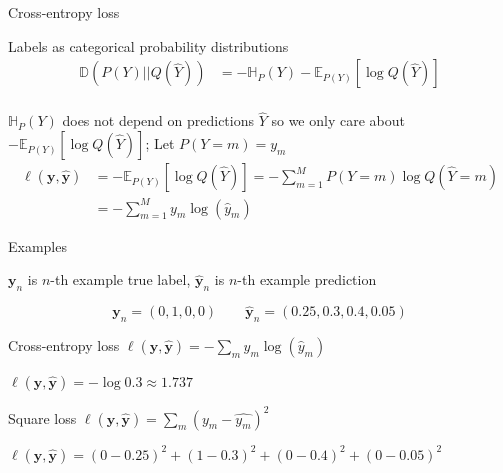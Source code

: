 \documentclass[12pt]{beamer}
\begin{document}
\begin{frame}{Cross-entropy loss}

Labels as categorical probability distributions
\begin{align*}
\mathbb{D}(P(Y) || Q(\hat{Y})) &= - \mathbb{H}_{P} (Y)  - \mathbb{E}_{P(Y)} \left[ \log Q(\hat{Y}) \right] \\
\end{align*}

$\mathbb{H}_{P} (Y)$ does not depend on predictions $\hat{Y}$ so we only care about $- \mathbb{E}_{P(Y)} \left[ \log Q(\hat{Y}) \right]$; Let $P(Y = m) = y_m$
\begin{align*}
\ell(\mathbf{y}, \hat{\mathbf{y}}) &= 
- \mathbb{E}_{P(Y)} \left[ \log Q(\hat{Y}) \right]
= - \sum_{m = 1}^{M} P(Y = m) \log Q(\hat{Y} = m)\\
&=-  \sum_{m = 1}^{M} y_m \log (\hat{y}_m) 
\end{align*}


\end{frame}


\begin{frame}{Examples}

$\mathbf{y}_n$ is $n$-th example true label, $\hat{\mathbf{y}}_n$ is $n$-th example prediction

$$\mathbf{y}_n = (0, 1, 0, 0) \qquad \hat{\mathbf{y}}_n = (0.25, 0.3, 0.4, 0.05)$$

Cross-entropy loss $\ell(\mathbf{y}, \hat{\mathbf{y}}) = - \sum_{m} y_m \log (\hat{y}_m)$

$\ell(\mathbf{y}, \hat{\mathbf{y}}) = - \log 0.3 \approx 1.737$

\bigskip

Square loss $\ell(\mathbf{y}, \hat{\mathbf{y}}) =  \sum_{m} (y_m - \hat{y_m})^2$

$\ell(\mathbf{y}, \hat{\mathbf{y}}) = (0-0.25)^2 + (1 - 0.3)^2 + (0-0.4)^2 + (0 - 0.05)^2$


\end{frame}
\end{document}
